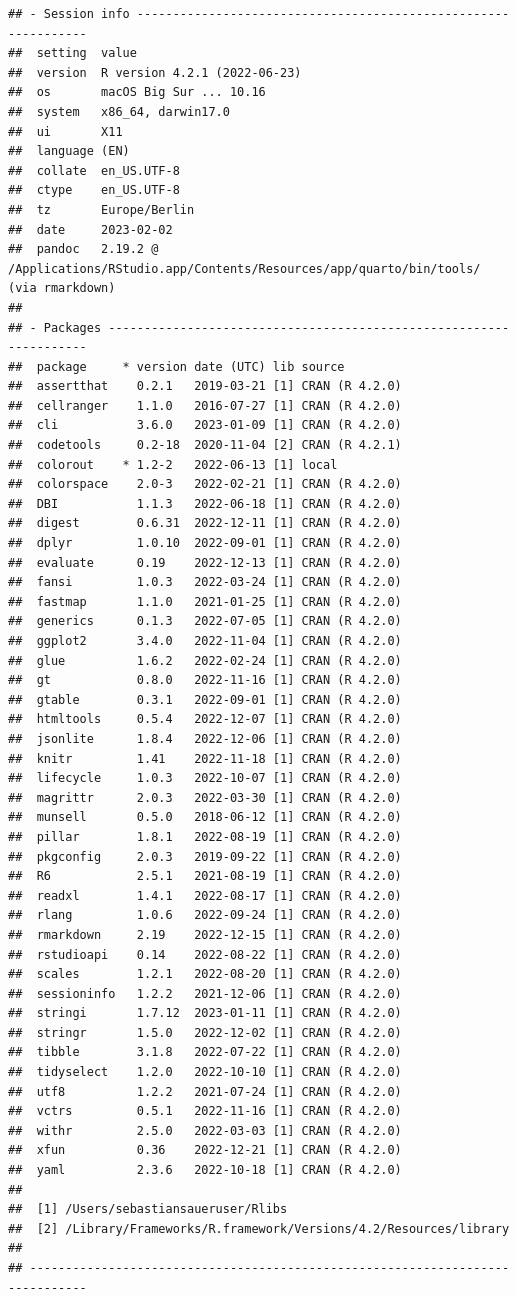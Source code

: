 \documentclass[
  a4paper,
  DIV=11]{scrreprt}
\theoremstyle{definition}
\theoremstyle{definition}
\theoremstyle{remark}
\begin{document}
\begin{verbatim}
## - Session info ---------------------------------------------------------------
##  setting  value
##  version  R version 4.2.1 (2022-06-23)
##  os       macOS Big Sur ... 10.16
##  system   x86_64, darwin17.0
##  ui       X11
##  language (EN)
##  collate  en_US.UTF-8
##  ctype    en_US.UTF-8
##  tz       Europe/Berlin
##  date     2023-02-02
##  pandoc   2.19.2 @ /Applications/RStudio.app/Contents/Resources/app/quarto/bin/tools/ (via rmarkdown)
## 
## - Packages -------------------------------------------------------------------
##  package     * version date (UTC) lib source
##  assertthat    0.2.1   2019-03-21 [1] CRAN (R 4.2.0)
##  cellranger    1.1.0   2016-07-27 [1] CRAN (R 4.2.0)
##  cli           3.6.0   2023-01-09 [1] CRAN (R 4.2.0)
##  codetools     0.2-18  2020-11-04 [2] CRAN (R 4.2.1)
##  colorout    * 1.2-2   2022-06-13 [1] local
##  colorspace    2.0-3   2022-02-21 [1] CRAN (R 4.2.0)
##  DBI           1.1.3   2022-06-18 [1] CRAN (R 4.2.0)
##  digest        0.6.31  2022-12-11 [1] CRAN (R 4.2.0)
##  dplyr         1.0.10  2022-09-01 [1] CRAN (R 4.2.0)
##  evaluate      0.19    2022-12-13 [1] CRAN (R 4.2.0)
##  fansi         1.0.3   2022-03-24 [1] CRAN (R 4.2.0)
##  fastmap       1.1.0   2021-01-25 [1] CRAN (R 4.2.0)
##  generics      0.1.3   2022-07-05 [1] CRAN (R 4.2.0)
##  ggplot2       3.4.0   2022-11-04 [1] CRAN (R 4.2.0)
##  glue          1.6.2   2022-02-24 [1] CRAN (R 4.2.0)
##  gt            0.8.0   2022-11-16 [1] CRAN (R 4.2.0)
##  gtable        0.3.1   2022-09-01 [1] CRAN (R 4.2.0)
##  htmltools     0.5.4   2022-12-07 [1] CRAN (R 4.2.0)
##  jsonlite      1.8.4   2022-12-06 [1] CRAN (R 4.2.0)
##  knitr         1.41    2022-11-18 [1] CRAN (R 4.2.0)
##  lifecycle     1.0.3   2022-10-07 [1] CRAN (R 4.2.0)
##  magrittr      2.0.3   2022-03-30 [1] CRAN (R 4.2.0)
##  munsell       0.5.0   2018-06-12 [1] CRAN (R 4.2.0)
##  pillar        1.8.1   2022-08-19 [1] CRAN (R 4.2.0)
##  pkgconfig     2.0.3   2019-09-22 [1] CRAN (R 4.2.0)
##  R6            2.5.1   2021-08-19 [1] CRAN (R 4.2.0)
##  readxl        1.4.1   2022-08-17 [1] CRAN (R 4.2.0)
##  rlang         1.0.6   2022-09-24 [1] CRAN (R 4.2.0)
##  rmarkdown     2.19    2022-12-15 [1] CRAN (R 4.2.0)
##  rstudioapi    0.14    2022-08-22 [1] CRAN (R 4.2.0)
##  scales        1.2.1   2022-08-20 [1] CRAN (R 4.2.0)
##  sessioninfo   1.2.2   2021-12-06 [1] CRAN (R 4.2.0)
##  stringi       1.7.12  2023-01-11 [1] CRAN (R 4.2.0)
##  stringr       1.5.0   2022-12-02 [1] CRAN (R 4.2.0)
##  tibble        3.1.8   2022-07-22 [1] CRAN (R 4.2.0)
##  tidyselect    1.2.0   2022-10-10 [1] CRAN (R 4.2.0)
##  utf8          1.2.2   2021-07-24 [1] CRAN (R 4.2.0)
##  vctrs         0.5.1   2022-11-16 [1] CRAN (R 4.2.0)
##  withr         2.5.0   2022-03-03 [1] CRAN (R 4.2.0)
##  xfun          0.36    2022-12-21 [1] CRAN (R 4.2.0)
##  yaml          2.3.6   2022-10-18 [1] CRAN (R 4.2.0)
## 
##  [1] /Users/sebastiansaueruser/Rlibs
##  [2] /Library/Frameworks/R.framework/Versions/4.2/Resources/library
## 
## ------------------------------------------------------------------------------
\end{verbatim}
\end{document}
